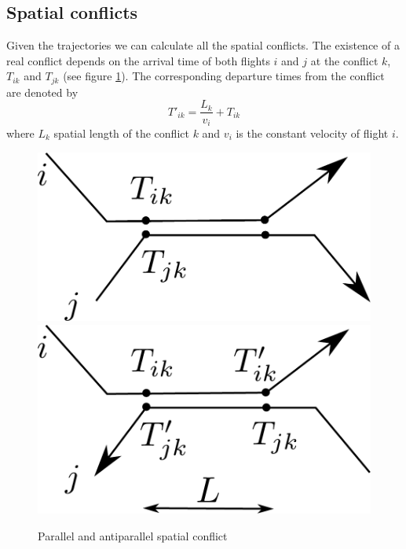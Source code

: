 \documentclass{article}
\begin{document}
\subsection{Spatial conflicts}
Given the trajectories we can calculate all the spatial conflicts.
The existence of a real conflict depends on the arrival time of both flights $i$ and $j$ at the conflict $k$, $T_{ik}$ and $T_{jk}$ (see figure \ref{fig:spatial_conflicts}). 
The corresponding departure times from the conflict are denoted by 
\begin{equation*}
    T'_{ik} = \frac{L_k}{v_i} + T_{ik}
\end{equation*}
where $L_k$ spatial length of the conflict $k$ and $v_i$ is the constant velocity of flight $i$.
\begin{figure}[htpb]
    \centering
    \includegraphics[width=0.3\linewidth]{pics/spatial_conflict_parallel.pdf}
    \hspace{1cm}
    \includegraphics[width=0.3\linewidth]{pics/spatial_conflict_anti_parallel.pdf}
    \caption{Parallel and antiparallel spatial conflict}
    \label{fig:spatial_conflicts}
\end{figure}
\end{document}
